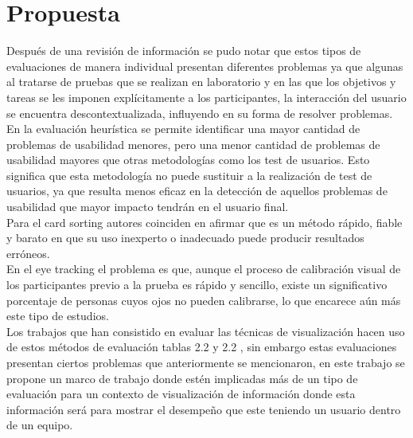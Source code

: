 \chapter{Propuesta}\label{cap.Propuesta}
Después de una revisión de información se pudo notar que estos tipos de evaluaciones de manera individual presentan diferentes problemas ya que algunas al tratarse de pruebas que se realizan en laboratorio y en las que los objetivos y tareas se les imponen explícitamente a los participantes, la interacción del usuario se encuentra descontextualizada, influyendo en su forma de resolver problemas.\\
En la evaluación heurística se permite identificar una mayor cantidad de problemas de usabilidad menores, pero una menor cantidad de problemas de usabilidad mayores que otras metodologías como los test de usuarios. Esto significa que esta metodología no puede sustituir a la realización de test de usuarios, ya que resulta menos eficaz en la detección de aquellos problemas de usabilidad que mayor impacto tendrán en el usuario final.\\
Para el card sorting autores coinciden en afirmar que es un método rápido, fiable y barato en que su uso inexperto o inadecuado puede producir resultados erróneos.\\
En el eye tracking el problema es que, aunque el proceso de calibración visual de los participantes previo a la prueba es rápido y sencillo, existe un significativo porcentaje de personas cuyos ojos no pueden calibrarse, lo que encarece aún más este tipo de estudios.\\
Los trabajos que han consistido en evaluar las técnicas de visualización hacen uso de estos métodos de evaluación tablas 2.2 y 2.2 , sin embargo estas evaluaciones presentan ciertos problemas que anteriormente se mencionaron, en este trabajo se propone un marco de trabajo donde estén implicadas más de un tipo de evaluación para un contexto de visualización de información donde esta información será para mostrar el desempeño que este teniendo un usuario dentro de un equipo.

